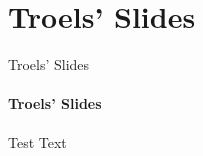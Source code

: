 \section{Troels' Slides}
    \begin{frame}[t]{Troels' Slides}\framesubtitle{Troels' Slides}
        Test Text
    \end{frame}